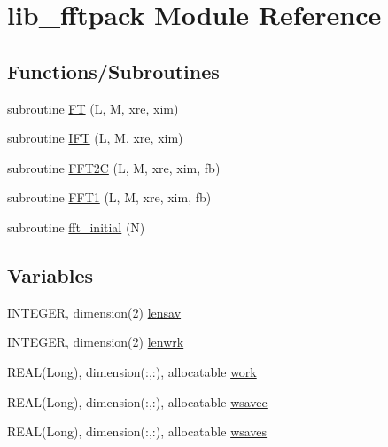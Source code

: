 \hypertarget{namespacelib__fftpack}{
\section{lib\_\-fftpack Module Reference}
\label{namespacelib__fftpack}
}
\subsection*{Functions/Subroutines}
\begin{DoxyCompactItemize}
\item 
subroutine \hyperlink{namespacelib__fftpack_af2aa9b83c8db599ebc1c6067577196c0}{FT} (L, M, xre, xim)
\item 
subroutine \hyperlink{namespacelib__fftpack_af56d1d1be2bb706b859f005211a0c456}{IFT} (L, M, xre, xim)
\item 
subroutine \hyperlink{namespacelib__fftpack_a5c1e7931d9bdbe2b1ea0a987081b0515}{FFT2C} (L, M, xre, xim, fb)
\item 
subroutine \hyperlink{namespacelib__fftpack_a7f10fb88597cc6a353d06d4695e8087a}{FFT1} (L, M, xre, xim, fb)
\item 
subroutine \hyperlink{namespacelib__fftpack_aa19152959277a8d6578da7c1a6fc0230}{fft\_\-initial} (N)
\end{DoxyCompactItemize}
\subsection*{Variables}
\begin{DoxyCompactItemize}
\item 
INTEGER, dimension(2) \hyperlink{namespacelib__fftpack_ad1ac8096e29c8f4d4eccbbcd5ff74bf1}{lensav}
\item 
INTEGER, dimension(2) \hyperlink{namespacelib__fftpack_af22a24940af26c19850b9add69cc2adf}{lenwrk}
\item 
REAL(Long), dimension(:,:), allocatable \hyperlink{namespacelib__fftpack_ac4c893477b0614d957edb4530d018191}{work}
\item 
REAL(Long), dimension(:,:), allocatable \hyperlink{namespacelib__fftpack_a45c5d0eb1be9cdebf49b3c56e861d0d6}{wsavec}
\item 
REAL(Long), dimension(:,:), allocatable \hyperlink{namespacelib__fftpack_a6ab9f0bc33149a5032987f2f843f883e}{wsaves}
\end{DoxyCompactItemize}


